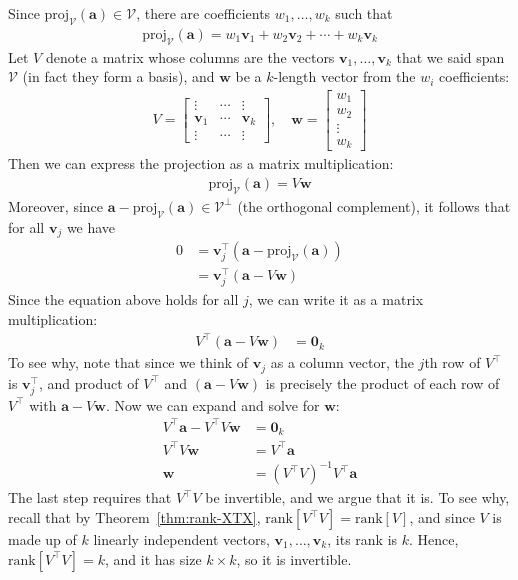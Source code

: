 \documentclass[12pt, a4paper]{article}
\theoremstyle{definition}
\begin{document}
	Since $\text{proj}_\mathcal{V}(\mathbf{a})\in \mathcal{V}$, there are coefficients
	$w_1,\ldots,w_k$ such that
	\begin{align*}
		\text{proj}_\mathcal{V}(\mathbf{a}) = w_1\mathbf{v}_1+w_2\mathbf{v}_2+\cdots+w_k\mathbf{v}_k
	\end{align*}
	Let $V$ denote a matrix whose columns are the vectors $\mathbf{v}_1,\ldots,\mathbf{v}_k$ that
	we said span $\mathcal{V}$ (in fact they form a basis), and $\mathbf{w}$ be a $k$-length
	vector from the $w_i$ coefficients:
	\begin{align*}
		V = \begin{bmatrix}
			\vdots & \cdots& \vdots\\
			\mathbf{v}_1 & \cdots& \mathbf{v}_k\\
			\vdots& \cdots & \vdots
		\end{bmatrix},\quad
		\mathbf{w} = \begin{bmatrix}
			w_1\\
			w_2\\
			\vdots\\
			w_k
		\end{bmatrix}
	\end{align*}
	Then we can express the projection as a matrix multiplication:
	\begin{align}
		\text{proj}_{\mathcal{V}}(\mathbf{a})=V\mathbf{w}\label{eqn:proj-system}
	\end{align}
	Moreover, since $\mathbf{a}-\text{proj}_{\mathcal{V}}(\mathbf{a})\in \mathcal{V}^\perp$
	(the orthogonal complement), it follows that for all $\mathbf{v}_j$ we have
	\begin{align*}
		0 &=\mathbf{v}_j^\top (\mathbf{a}-\text{proj}_{\mathcal{V}}(\mathbf{a}))\\
		&=\mathbf{v}_j^\top(\mathbf{a}-V\mathbf{w})
	\end{align*}
	Since the equation above holds for all $j$, we can write it as a matrix multiplication:
	\begin{align*}
		V^\top(\mathbf{a} - V\mathbf{w}) &= \mathbf{0}_k
	\end{align*}
	To see why, note that since we think of $\mathbf{v}_j$ as a column vector, the $j$th row of $V^\top$ 
	is $\mathbf{v}_j^\top$, and product of $V^\top$ and $(\mathbf{a}-V \mathbf{w})$ is precisely
	the product of each row of $V^\top$ with $\mathbf{a}-V\mathbf{w}$. Now we can expand and
	solve for $\mathbf{w}$:
	\begin{align}
		V^\top \mathbf{a} - V^\top V\mathbf{w} &= \mathbf{0}_{k}\nonumber\\
		V^\top V \mathbf{w} &= V^\top \mathbf{a}\nonumber\\
		\mathbf{w} &= (V^\top V)^{-1} V^\top \mathbf{a}\label{eqn:proj-coeffs}
	\end{align}
	The last step requires that $V^\top V$ be invertible, and we argue that it is.
	To see why, recall that by Theorem~\ref{thm:rank-XTX}, $\text{rank}[V^\top V] = \text{rank}[V]$,
	and since $V$ is made up of $k$ linearly independent vectors, $\mathbf{v}_1,\ldots,\mathbf{v}_k$,
	its rank is $k$. Hence, $\text{rank}[V^\top V]=k$, and it has size $k\times k$, so it is
	invertible.
	
\end{document}
